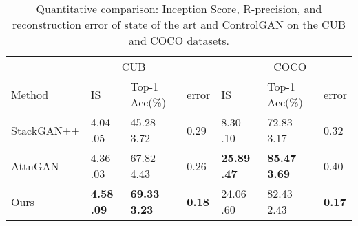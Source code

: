\documentclass{article}
\begin{document}
\begin{table}
\small
  \caption{Quantitative comparison: Inception Score, R-precision, and  reconstruction error of state of the art and ControlGAN on the CUB and COCO datasets.}
  \label{quantity}
  \centering
  \bigskip
  \begin{tabular}{lllllll}
    \toprule
    \multicolumn{5}{c}{CUB} &
    \multicolumn{1}{c}{COCO}     \\             
    \cmidrule(r){2-4}
    \cmidrule(r){5-7}
    Method     & IS     & Top-1 Acc(\%)  &  error     & IS & Top-1 Acc(\%) &  error\\
    \midrule
    StackGAN++ & 4.04  .05  & 45.28  3.72  & 0.29  & 8.30  .10 & 72.83  3.17 & 0.32 \\
    AttnGAN    & 4.36  .03  & 67.82  4.43 & 0.26     & \textbf{25.89  .47} & \textbf{85.47  3.69} & 0.40\\
    Ours     & \textbf{4.58  .09}   & \textbf{69.33  3.23}   & \textbf{0.18}     & 24.06  .60 &82.43  2.43 & \textbf{0.17}\\
    \bottomrule
  \end{tabular}
  \label{tabel:quant_cmp}
\end{table}
\end{document}
